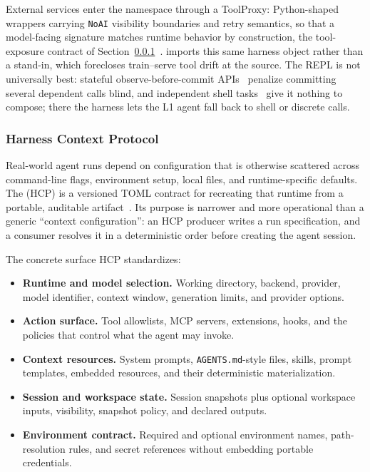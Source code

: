 External services enter the namespace through a ToolProxy: Python-shaped wrappers carrying \verb|NoAI| visibility boundaries and retry semantics, so that a model-facing signature matches runtime behavior by construction, the tool-exposure contract of Section~\ref{sec:harness_hcp}~\citep{macaron_v1_blog2026}. \mindforge{} imports this same harness object rather than a stand-in, which forecloses train--serve tool drift at the source. The REPL is not universally best: stateful observe-before-commit APIs~\citep{patil2025berkeley} penalize committing several dependent calls blind, and independent shell tasks~\citep{terminalbench2026} give it nothing to compose; there the harness lets the L1 agent fall back to shell or discrete calls.

\subsubsection{Harness Context Protocol}
\label{sec:harness_hcp}

Real-world agent runs depend on configuration that is otherwise scattered across command-line flags, environment setup, local files, and runtime-specific defaults. The \hcp{} (HCP) is a versioned TOML contract for recreating that runtime from a portable, auditable artifact~\citep{hcp_sdk2026}. Its purpose is narrower and more operational than a generic ``context configuration'': an HCP producer writes a run specification, and a consumer resolves it in a deterministic order before creating the agent session.

The concrete surface HCP standardizes:
\begin{itemize}[leftmargin=*]
  \item \textbf{Runtime and model selection.} Working directory, backend, provider, model identifier, context window, generation limits, and provider options.
  \item \textbf{Action surface.} Tool allowlists, MCP servers, extensions, hooks, and the policies that control what the agent may invoke.
  \item \textbf{Context resources.} System prompts, \texttt{AGENTS.md}-style files, skills, prompt templates, embedded resources, and their deterministic materialization.
  \item \textbf{Session and workspace state.} Session snapshots plus optional workspace inputs, visibility, snapshot policy, and declared outputs.
  \item \textbf{Environment contract.} Required and optional environment names, path-resolution rules, and secret references without embedding portable credentials.
\end{itemize}

